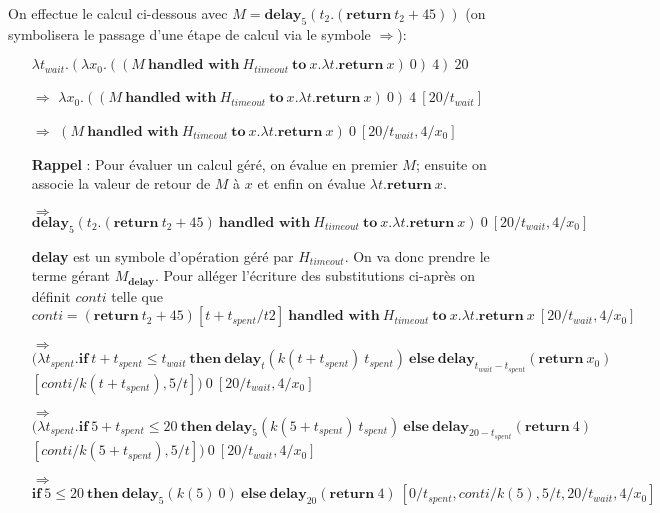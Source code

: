 	\begin{exemple}
		On effectue le calcul ci-dessous avec $M = \textbf{delay}_5(t_2.(\textbf{return}~t_2 + 45))$ (on symbolisera le passage d'une étape de calcul via le symbole $\Rightarrow$):
		\begin{enumerate}
			\item[] $\lambda t_{wait}.(\lambda x_0.((M~\textbf{handled~with}~H_{timeout}~\textbf{to}~x.\lambda t.\textbf{return}~x)~0)~4)~20$
			\item[$\Rightarrow$] $\lambda x_0.((M~\textbf{handled~with}~H_{timeout}~\textbf{to}~x.\lambda t.\textbf{return}~x)~0)~4~[20/t_{wait}]$
			\item[$\Rightarrow$] $(M~\textbf{handled~with}~H_{timeout}~\textbf{to}~x.\lambda t.\textbf{return}~x)~0~[20/t_{wait},4/x_0]$
			\item[] 
			\bigbreak
			\textbf{Rappel} : Pour évaluer un calcul géré, on évalue en premier $M$; ensuite on associe la valeur de retour de $M$ à $x$ et enfin on évalue $\lambda t.\textbf{return}~x$.
			\bigbreak
			\item[$\Rightarrow$] 
			$\textbf{delay}_5(t_2.(\textbf{return}~t_2 + 45)~\textbf{handled~with}~H_{timeout}~\textbf{to}~x.\lambda t.\textbf{return}~x)~0~[20/t_{wait},4/x_0]$
			\item[]
			\bigbreak
			\textbf{delay} est un symbole d'opération géré par $H_{timeout}$. On va donc prendre le terme gérant $M_\textbf{delay}$. Pour alléger l'écriture des substitutions ci-après on définit $conti$ telle que \smallbreak
			$conti = (\textbf{return}~t_2 + 45)[t + t_{spent}/t2]~\textbf{handled~with}~H_{timeout}~\textbf{to}~x.\lambda t.\textbf{return}~x~[20/t_{wait},4/x_0]$
			\bigbreak
			\item[$\Rightarrow$] 
			$\textbf{(}\lambda t_{spent}.\textbf{if}~t+t_{spent} \leq t_{wait}~\textbf{then}~\textbf{delay}_t(k(t+t_{spent})~t_{spent})~\textbf{else}~\textbf{delay}_{t_{wait} - t_{spent}}(\textbf{return}~x_0)$
			\\$[conti/k(t + t_{spent}),5/t]\textbf{)}~0~[20/t_{wait},4/x_0]$
			\item[$\Rightarrow$]
			$\textbf{(}\lambda t_{spent}.\textbf{if}~5+t_{spent} \leq 20~\textbf{then}~\textbf{delay}_5(k(5+t_{spent})~t_{spent})~\textbf{else}~\textbf{delay}_{20 - t_{spent}}(\textbf{return}~4)$
			\\
			$[conti/k(5 + t_{spent}),5/t]\textbf{)}~0~[20/t_{wait},4/x_0]$
			\item[$\Rightarrow$] $\textbf{if}~5 \leq 20~\textbf{then}~\textbf{delay}_5(k(5)~0)~\textbf{else}~\textbf{delay}_{20}(\textbf{return}~4)~[0/t_{spent},conti/k(5),5/t,20/t_{wait},4/x_0]$

\end{enumerate}
\end{exemple}
